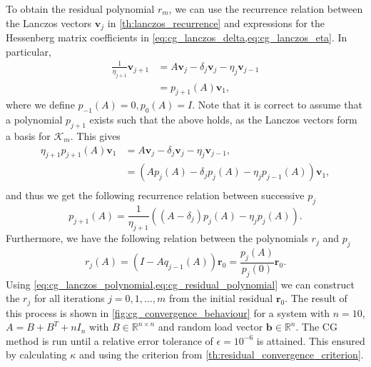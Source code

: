 To obtain the residual polynomial $r_m$, we can use the recurrence relation between the Lanczos vectors $\mathbf{v}_j$ in \cref{th:lanczos_recurrence} and expressions for the Hessenberg matrix coefficients in \cref{eq:cg_lanczos_delta,eq:cg_lanczos_eta}. In particular,
\begin{align*}
  \frac{1}{\eta_{j+1}} \mathbf{v}_{j+1} & = A \mathbf{v}_j - \delta_j \mathbf{v}_j - \eta_j \mathbf{v}_{j-1} \\
                                        & = p_{j+1}(A) \mathbf{v}_1,
\end{align*}
where we define $p_{-1}(A) = 0, p_0(A) = I$. Note that it is correct to assume that a polynomial $p_{j+1}$ exists such that the above holds, as the Lanczos vectors form a basis for $\mathcal{K}_m$. This gives
\begin{align*}
  \eta_{j+1}p_{j+1}(A)\mathbf{v}_1 & = A \mathbf{v}_j - \delta_j \mathbf{v}_j - \eta_j \mathbf{v}_{j-1},          \\
                                   & = \left( A p_j(A) - \delta_j p_j(A) - \eta_j p_{j-1}(A) \right)\mathbf{v}_1, \\
\end{align*}
and thus we get the following recurrence relation between successive $p_j$
\begin{equation}
  p_{j+1}(A) = \frac{1}{\eta_{j+1}}\left( (A - \delta_j )p_j(A) - \eta_j p_{j}(A) \right).
  \label{eq:cg_lanczos_polynomial}
\end{equation}
Furthermore, we have the following relation between the polynomials $r_j$ and $p_j$ \cite[Section 3.2]{Meurant_Strakoš_2006}
\begin{equation}
  r_{j}(A) = (I-Aq_{j-1}(A))\mathbf{r}_0 = \frac{p_{j}(A)}{p_{j}(0)}\mathbf{r}_0.
  \label{eq:cg_residual_polynomial}
\end{equation}
Using \cref{eq:cg_lanczos_polynomial,eq:cg_residual_polynomial} we can construct the $r_j$ for all iterations $j=0,1,\dots,m$ from the initial residual $\mathbf{r}_0$. The result of this process is shown in \cref{fig:cg_convergence_behaviour} for a system with $n=10$, $A = B + B^T + nI_n$ with $B\in\mathbb{R}^{n \times n}$ and random load vector $\mathbf{b}\in\mathbb{R}^n$. The CG method is run until a relative error tolerance of $\epsilon = 10^{-6}$ is attained. This ensured by calculating $\kappa$ and using the criterion from \cref{th:residual_convergence_criterion}.

